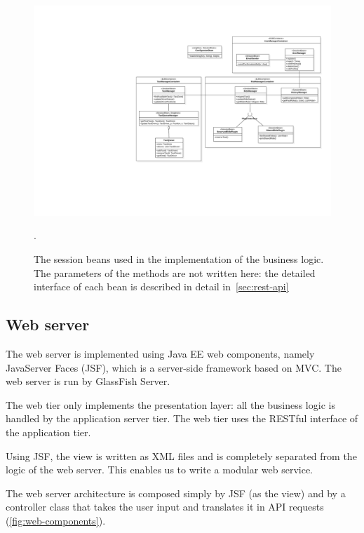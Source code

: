 \begin{figure}
    \centering
    \includegraphics[width=\textwidth]{diagrams/class_sessionbeans}
    \caption{The session beans used in the implementation of the business logic. The parameters of the methods are not written here: the detailed interface of each bean is described in detail in~\autoref{sec:rest-api}}.
    \label{fig:session-beans}
\end{figure}

\subsection{Web server}
The web server is implemented using Java EE web components, namely JavaServer Faces (JSF), which is a server-side framework based on MVC.
The web server is run by GlassFish Server.

The web tier only implements the presentation layer: all the business logic is handled by the application server tier. The web tier uses the RESTful interface of the application tier.

Using JSF, the view is written as XML files and is completely separated from the logic of the web server. This enables us to write a modular web service.

The web server architecture is composed simply by JSF (as the view) and by a controller class that takes the user input and translates it in API requests (\autoref{fig:web-components}).

